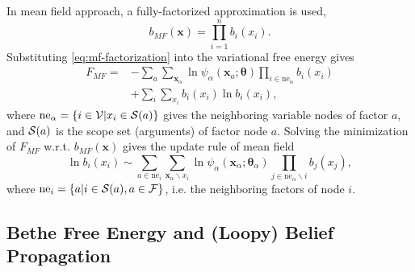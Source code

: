 In mean field approach, a fully-factorized approximation is used,
\begin{equation}\label{eq:mf-factorization}
  b_{MF}(\bm{x}) = \prod_{i=1}^{n}b_i(x_i).
\end{equation}
Substituting \eqref{eq:mf-factorization} into the variational free energy gives
\begin{align}
  F_{MF} = & - \sum_{a}\sum_{\bm{x}_{\alpha}} \ln{\psi_{\alpha}(\bm{x}_{a};\bm{\theta})}
             \prod_{i\in \mathrm{ne}_{\alpha}}b_i(x_i) \nonumber\\
           &+ \sum_i \sum_{x_i} b_i(x_i) \ln{b_i(x_i)},
\end{align}
where $\mathrm{ne}_{\alpha} = \left\{ i \in \mathcal{V} | x_i \in \mathcal{S}(a) \right\}$ gives the neighboring variable nodes of factor $a$, and $\mathcal{S}(a)$ is the scope set (arguments) of factor node $a$.
Solving the minimization of $F_{MF}$ w.r.t. $b_{MF}(\bm{x})$ gives the
update rule of mean field
\begin{equation}
  \ln{b_i(x_i)} \sim \sum_{a\in \mathrm{ne}_i} \sum_{\bm{x}_{\alpha} \backslash x_i} \ln{\psi_{\alpha}}(\bm{x}_{\alpha};\bm{\theta}_{\alpha}) \prod_{j\in \mathrm{ne}_{\alpha}\backslash i} b_j(x_j),
\end{equation}
where $\mathrm{ne}_i = \left\{ a | i \in \mathcal{S}(a), a \in \mathcal{F} \right\}$, i.e. the
neighboring factors of node $i$.

\subsection{Bethe Free Energy and (Loopy) Belief Propagation}


